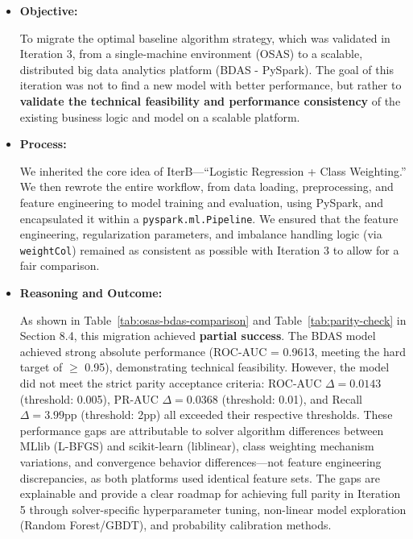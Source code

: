 \documentclass[sigplan,screen]{acmart}
\begin{document}
\begin{itemize}
\item \textbf{Objective:}

To migrate the optimal baseline algorithm strategy, which was validated in Iteration 3, from a single-machine environment (OSAS) to a scalable, distributed big data analytics platform (BDAS - PySpark). The goal of this iteration was not to find a new model with better performance, but rather to \textbf{validate the technical feasibility and performance consistency} of the existing business logic and model on a scalable platform.

\item \textbf{Process:}

We inherited the core idea of IterB---``Logistic Regression + Class Weighting.'' We then rewrote the entire workflow, from data loading, preprocessing, and feature engineering to model training and evaluation, using PySpark, and encapsulated it within a\newline
\texttt{pyspark.ml.Pipeline}. We ensured that the feature engineering, regularization parameters,\newline
and imbalance handling logic (via \texttt{weightCol}) remained as consistent as possible with Iteration 3 to allow for a fair comparison.

\item \textbf{Reasoning and Outcome:}

As shown in Table~\ref{tab:osas-bdas-comparison} and Table~\ref{tab:parity-check} in Section 8.4, this migration achieved \textbf{partial success}. The BDAS model achieved strong absolute performance (ROC-AUC = 0.9613, meeting the hard target of $\geq$ 0.95), demonstrating technical feasibility. However, the model did not meet the strict parity acceptance criteria: ROC-AUC $\Delta=0.0143$ (threshold: 0.005), PR-AUC $\Delta=0.0368$ (threshold: 0.01), and Recall $\Delta=3.99$pp (threshold: 2pp) all exceeded their respective thresholds. These performance gaps are attributable to solver algorithm differences between MLlib (L-BFGS) and scikit-learn (liblinear), class weighting mechanism variations, and convergence behavior differences—not feature engineering discrepancies, as both platforms used identical feature sets. The gaps are explainable and provide a clear roadmap for achieving full parity in Iteration 5 through solver-specific hyperparameter tuning, non-linear model exploration (Random Forest/GBDT), and probability calibration methods.
\end{itemize}
\end{document}
